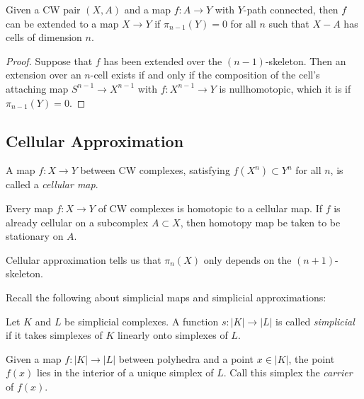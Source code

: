 \begin{lemma}\label{Extension-Lemma}
    Given a CW pair $\left( X,A \right) $ and a map
    $f \colon A \to Y$ with $Y$-path connected,
    then $f$ can be extended to a map
    $X \to Y$ if $\pi_{n-1}(Y) = 0$ for all $n$ such that
    $X -A$ has cells of dimension $n$.
\end{lemma}

\begin{proof}
    Suppose that $f$ has been extended over the
    $\left( n-1 \right) $-skeleton. Then an extension
    over an $n$-cell exists if and only if
    the composition of the cell's attaching
    map $S^{n-1} \to X^{n-1}$ with $f
    \colon X^{n-1} \to Y$ is nullhomotopic, which
    it is if $\pi_{n-1} (Y) = 0$.
\end{proof}

\subsection{Cellular Approximation}

\begin{definition}
    A map $f \colon X \to Y$ between CW complexes,
    satisfying
    $f(X^{n}) \subset Y^{n}$ for all $n$, is called
    a \textit{cellular map}.
\end{definition}

\begin{theorem}
    Every map $f \colon X \to Y$ of CW complexes is homotopic
    to a cellular map. If $f$ is already cellular
    on a subcomplex $A \subset X$, then homotopy
    map be taken to be stationary on $A$.
\end{theorem}

\begin{remark}[]
    Cellular approximation tells us
    that $\pi_n(X)$ only depends on
    the $(n+1)$-skeleton.
\end{remark}

Recall the following about simplicial maps and simplicial
approximations:

\begin{definition}
    Let $K$ and $L$ be simplicial complexes. A function
    $s \colon \left| K \right| \to \left| L \right| $ 
    is called \textit{simplicial} if it takes simplexes
    of $K$ linearly onto simplexes of $L$.
\end{definition}

\begin{definition}[Carrier of $f(x)$]
    Given a map  $f \colon \left| K \right| 
    \to \left| L \right| $ between polyhedra and a
    point $x \in \left| K \right| $, the point
    $f(x)$ lies in the interior of a unique simplex of
    $L$. Call this simplex the \textit{carrier} of 
    $f(x)$.
\end{definition}

